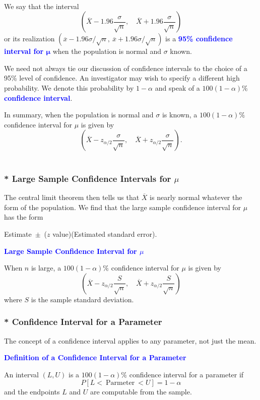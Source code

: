 \documentclass[12pt,a4paper]{article}
\begin{document}
\\
We say that the interval \[
\left(\overline{X}-1.96\frac{\sigma}{\sqrt{n}},\quad \overline{X}+1.96\frac{\sigma}{\sqrt{n}}\right)
\] or its realization $\left(\overline{x}-1.96\sigma/\sqrt{n},\ \overline{x}+1.96\sigma/\sqrt{n} \right)$ is a \textcolor{blue}{\bf 95\% confidence interval for $\boldsymbol{\mu}$} when the population is normal and $\sigma$ known. \par
We need not always tie our discussion of confidence intervals to the choice of a 95\% level of confidence. An investigator may wish to specify a different high probability. We denote this probability by $1-\alpha$ and speak of a $100(1-\alpha)\%$ \textcolor{blue}{\bf confidence interval}.\par
In summary, when the population is normal and $\sigma$ is known, a $100(1-\alpha)\%$ confidence interval for $\mu$ is given by \[
\left(\overline{X}-z_{\alpha/2}\frac{\sigma}{\sqrt{n}},\quad\overline{X}+z_{\alpha/2}\frac{\sigma}{\sqrt{n}} \right).
\]
\\
\subsubsection*{* Large Sample Confidence Intervals for $\mu$}
The central limit theorem then tells us that $\overline{X}$ is nearly normal whatever the form of the
population. We find that the large sample confidence interval for $\mu$ has the form \begin{center}
	Estimate\ $\pm$\ ($z$ value)(Estimated standard error).
\end{center}

\begin{tcolorbox}[colback=white]\begin{center}
		\textcolor{blue}{\bf Large Sample Confidence Interval for $\mu$}
	\end{center}
	When $n$ is large, a $100(1-\alpha)\%$ confidence interval for $\mu$ is given by \[
	\left(\overline{X}-z_{\alpha/2}\frac{S}{\sqrt{n}},\quad\overline{X}+z_{\alpha/2}\frac{S}{\sqrt{n}} \right)
	\] where $S$ is the sample standard deviation.
\end{tcolorbox}

\subsubsection*{* Confidence Interval for a Parameter}
The concept of a confidence interval applies to any parameter, not just the mean.
\begin{tcolorbox}[colback=white]\begin{center}
		\textcolor{blue}{\bf Definition of a Confidence Interval for a Parameter}
	\end{center}
	An interval $(L, U)$ is a $100(1-\alpha)\%$ confidence interval for a parameter if \[
	P\left[L<\ \text{Parmeter}\ < U \right] = 1-\alpha
	\] and the endpoints $L$ and $U$ are computable from the sample.
\end{tcolorbox}
\end{document}
